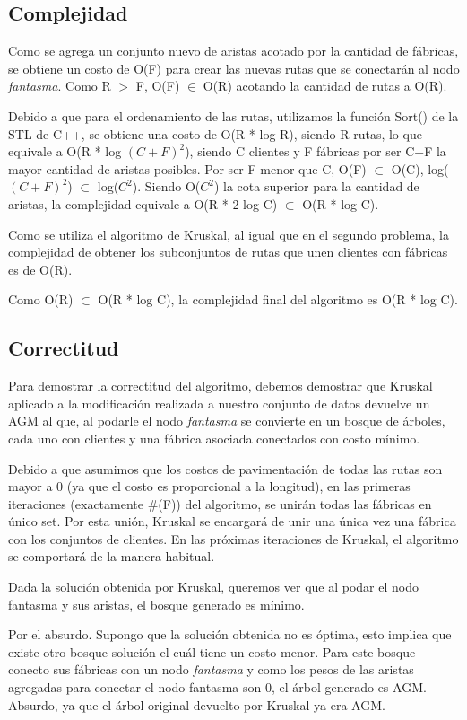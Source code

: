 \documentclass[a4paper, 10pt, twoside]{article}
\begin{document}
\subsection{Complejidad}

Como se agrega un conjunto nuevo de aristas acotado por la cantidad de fábricas, se obtiene un costo de O(F) para crear las nuevas rutas que se conectarán al nodo \textit{fantasma}. Como R $>$ F, O(F) $\in$ O(R) acotando la cantidad de rutas a O(R).

Debido a que para el ordenamiento de las rutas, utilizamos la función Sort() de la STL de C++, se obtiene una costo de O(R * log R), siendo R rutas, lo que equivale a O(R * log $(C+F)^2$), siendo C clientes y F fábricas por ser C+F la mayor cantidad de aristas posibles. Por ser F menor que C, O(F) $\subset$ O(C), log($(C+F)^2$) $\subset$ log($C^2$). Siendo O($C^2$) la cota superior para la cantidad de aristas, la complejidad equivale a O(R * 2 log C) $\subset$ O(R * log C).

Como se utiliza el algoritmo de Kruskal, al igual que en el segundo problema, la complejidad de obtener los subconjuntos de rutas que unen clientes con fábricas es de O(R).

Como O(R) $\subset$ O(R * log C), la complejidad final del algoritmo es O(R * log C).
\subsection{Correctitud}
Para demostrar la correctitud del algoritmo, debemos demostrar que Kruskal aplicado a la modificación realizada a nuestro conjunto de datos devuelve un AGM al que, al podarle el nodo \textit{fantasma} se convierte en un bosque de árboles, cada uno con clientes y una fábrica asociada conectados con costo mínimo.

Debido a que asumimos que los costos de pavimentación de todas las rutas son mayor a 0 (ya que el costo es proporcional a la longitud), en las primeras iteraciones (exactamente \#(F)) del algoritmo, se unirán todas las fábricas en único set. Por esta unión, Kruskal se encargará de unir una única vez una fábrica con los conjuntos de clientes. En las próximas iteraciones de Kruskal, el algoritmo se comportará  de la manera habitual.

Dada la solución obtenida por Kruskal, queremos ver que al podar el nodo fantasma y sus aristas, el bosque generado es mínimo.

Por el absurdo. Supongo que la solución obtenida no es óptima, esto implica que existe otro bosque solución el cuál tiene un costo menor. Para este bosque conecto sus fábricas con un nodo \textit{fantasma} y como los pesos de las aristas agregadas para conectar el nodo fantasma son 0, el árbol generado es AGM. Absurdo, ya que el árbol original devuelto por Kruskal ya era AGM.
\end{document}
